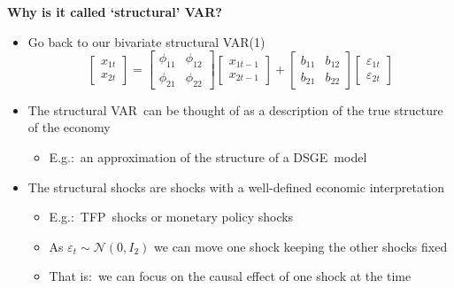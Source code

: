 \begin{frame}
{\textbf{Why is it called `structural' VAR?}}\medskip

\begin{itemize}
\item Go back to our bivariate structural VAR(1)%
\begin{equation*}
\begin{bmatrix}
x_{1t} \\ 
x_{2t}%
\end{bmatrix}%
=\left[ 
\begin{array}{cc}
\phi _{11} & \phi _{12} \\ 
\phi _{21} & \phi _{22}%
\end{array}%
\right] 
\begin{bmatrix}
x_{1t-1} \\ 
x_{2t-1}%
\end{bmatrix}%
+\left[ 
\begin{array}{cc}
b_{11} & b_{12} \\ 
b_{21} & b_{22}%
\end{array}%
\right] 
\begin{bmatrix}
\varepsilon _{1t} \\ 
\varepsilon _{2t}%
\end{bmatrix}%
\end{equation*}

\item The structural VAR\ can be thought of as a description of the true
structure of the economy\smallskip

\begin{itemize}
\item E.g.:\ an approximation of the structure of a DSGE\ model\bigskip
\end{itemize}

\item The structural shocks are shocks with a well-defined economic
interpretation\smallskip

\begin{itemize}
\item E.g.:\ TFP\ shocks or monetary policy shocks\medskip

\item As $\varepsilon _{t}\sim \mathcal{N}(0,I_{2})$ we can move one shock
keeping the other shocks fixed\medskip

\item That is:\ we can focus on the causal effect of one shock at the time
\end{itemize}
\end{itemize}
\end{frame}

